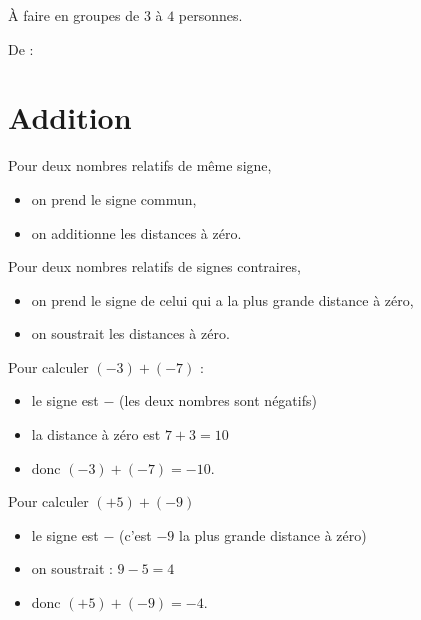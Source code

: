 
À faire en groupes de \( 3\) à \( 4\) personnes.

De : \cite{VJNYooBKjymp}


\section{Addition}

\begin{definition}
    Pour  deux nombres relatifs de même signe,
    \begin{itemize}
        \item on prend le signe commun,
        \item on additionne les distances à zéro.
    \end{itemize}
    Pour  deux nombres relatifs de signes contraires,
    \begin{itemize}
        \item on prend le signe de celui qui a la plus grande distance à zéro,
        \item on soustrait les distances à zéro.
    \end{itemize}
\end{definition}

\begin{example}
    Pour calculer \( (-3)+(-7)\) :
    \begin{itemize}
        \item le signe est \( -\) (les deux nombres sont négatifs)
        \item la distance à zéro est \( 7+3=10\)
        \item donc \( (-3)+(-7)=-10\).
    \end{itemize}
    Pour calculer \( (+5)+(-9)\)
    \begin{itemize}
        \item le signe est \( -\) (c'est \( -9\) la plus grande distance à zéro)
        \item on soustrait : \( 9-5=4\)
        \item donc \( (+5)+(-9)=-4\).
    \end{itemize}
\end{example}

